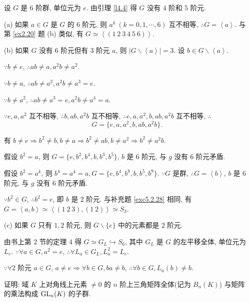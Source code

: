 \documentclass[color=black,device=normal,lang=cn,mode=geye]{elegantnote}
\begin{document}
\begin{solution}
    设 $G$ 是 $6$ 阶群, 单位元为 $e$. 由引理 \ref{l4.4} 得 $G$ 没有 $4$ 阶和 $5$ 阶元.
    
    (a) 如果 $a\in G$ 是 $G$ 的 $6$ 阶元, 则 $a^k\ (k=0,1,\cdots,6)$ 互不相等, $\therefore G=\left<a\right>$. 与第 \ref{ex2.20} 题 (b) 类似, 有 $G\simeq\left<(1\ 2\ 3\ 4\ 5\ 6)\right>$.

    (b) 如果 $G$ 没有 $6$ 阶元但有 $3$ 阶元 $a$, 则 $|G\backslash\left<a\right>|=3$. 设 $b\in G\backslash\left<a\right>$.

    $\because b\neq e$, $\therefore ab\neq a,a^2b\neq a^2$.
    
    $\because b\neq a$, $\therefore ab\neq a^2,a^2b\neq a^3=e$. 
    
    $\because b\neq a^2$, $\therefore ab\neq a^3=e,a^2b\neq a^4=a$.

    $\because e,a,a^2$ 互不相等, $\therefore b,ab,a^2b$ 互不相等, $\therefore e,a,a^2,b,ab,a^2b$ 互不相等, $\therefore$
    \[G=\{e,a,a^2,b,ab,a^2b\}.\]

    有 $b\neq e\Rightarrow b^2\neq b,b\neq a\Rightarrow b^2\neq ab,b\neq a^2\Rightarrow b^2\neq a^2b$.

    假设 $b^2=a$, 则 $G=\{e,b^2,b^4,b,b^3,b^5\}$, $b$ 是 $6$ 阶元, 与 $g$ 没有 $6$ 阶元矛盾.

    假设 $b^2=a^k$, 则 $b^4=a^4=a,G=\{e,b^4,b^8,b,b^5,b^9\}$. $\because G$ 是群, $\therefore G=\left<b\right>$, $b$ 是 $6$ 阶元, 与 $g$ 没有 $6$ 阶元矛盾.

    $\because b^2\in G$, $\therefore b^2=e$, 即 $b$ 是 $2$ 阶元. 与补充题 \ref{exc5.2.28} 相同, 有 $G=\left<a,b\right>\simeq\left<(1\ 2\ 3),(1\ 2)\right>\simeq S_3$.

    (c) 如果 $G$ 只有 $1,2$ 阶元, 则 $G\backslash\{e\}$ 中的元素都是 $2$ 阶元.

    由书上第 2 节的定理 4 得 $G\simeq G_L\hookrightarrow S_6$, 其中 $G_L$ 是 $G$ 的左平移全体, 单位元为 $L_e$. $\because\forall a\in G,a^2=e$, $\therefore\forall L_a\in G_L,L_a^2=L_e$.

    $\because\forall2$ 阶元 $a\in G$, $a\neq e\Rightarrow\forall b\in G,ba\neq b$, $\therefore\forall b\in G,L_a(b)\neq b$.
\end{solution}
\begin{exercisec}
    证明: 域 $K$ 上对角线上元素 $\neq0$ 的 $n$ 阶上三角矩阵全体(记为 $B_n(K)$) 与矩阵的乘法构成 $\operatorname{GL}_n(K)$ 的子群.
\end{exercisec}
\end{document}
